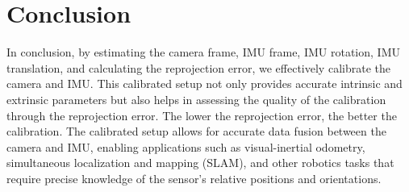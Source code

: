 \documentclass{article}
\begin{document}
\section*{Conclusion}
In conclusion, by estimating the camera frame, 
IMU frame, IMU rotation, IMU translation, 
and calculating the reprojection error, 
we effectively calibrate the camera and IMU. 
This calibrated setup not only provides accurate 
intrinsic and extrinsic parameters but also helps 
in assessing the quality of the calibration through 
the reprojection error. The lower the reprojection error, 
the better the calibration. 
The calibrated setup allows for accurate data 
fusion between the camera and IMU, 
enabling applications such as visual-inertial odometry, 
simultaneous localization and mapping (SLAM), 
and other robotics tasks that require 
precise knowledge of the sensor's relative positions and orientations.
\end{document}
